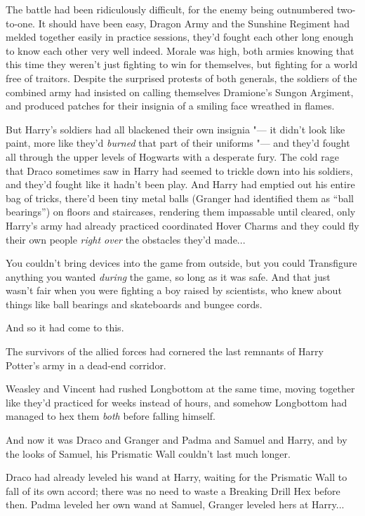 The battle had been ridiculously difficult, for the enemy being
outnumbered two-to-one. It should have been easy, Dragon Army and the
Sunshine Regiment had melded together easily in practice sessions,
they'd fought each other long enough to know each other very well
indeed. Morale was high, both armies knowing that this time they weren't
just fighting to win for themselves, but fighting for a world free of
traitors. Despite the surprised protests of both generals, the soldiers
of the combined army had insisted on calling themselves Dramione's
Sungon Argiment, and produced patches for their insignia of a smiling
face wreathed in flames.

But Harry's soldiers had all blackened their own insignia "--- it didn't
look like paint, more like they'd \emph{burned} that part of their
uniforms "--- and they'd fought all through the upper levels of Hogwarts
with a desperate fury. The cold rage that Draco sometimes saw in Harry
had seemed to trickle down into his soldiers, and they'd fought like it
hadn't been play. And Harry had emptied out his entire bag of tricks,
there'd been tiny metal balls (Granger had identified them as ``ball
bearings'') on floors and staircases, rendering them impassable until
cleared, only Harry's army had already practiced coordinated Hover
Charms and they could fly their own people \emph{right over} the
obstacles they'd made...

You couldn't bring devices into the game from outside, but you could
Transfigure anything you wanted \emph{during} the game, so long as it
was safe. And that just wasn't fair when you were fighting a boy raised
by scientists, who knew about things like ball bearings and skateboards
and bungee cords.

And so it had come to this.

The survivors of the allied forces had cornered the last remnants of
Harry Potter's army in a dead-end corridor.

Weasley and Vincent had rushed Longbottom at the same time, moving
together like they'd practiced for weeks instead of hours, and somehow
Longbottom had managed to hex them \emph{both} before falling himself.

And now it was Draco and Granger and Padma and Samuel and Harry, and by
the looks of Samuel, his Prismatic Wall couldn't last much longer.

Draco had already leveled his wand at Harry, waiting for the Prismatic
Wall to fall of its own accord; there was no need to waste a Breaking
Drill Hex before then. Padma leveled her own wand at Samuel, Granger
leveled hers at Harry...

